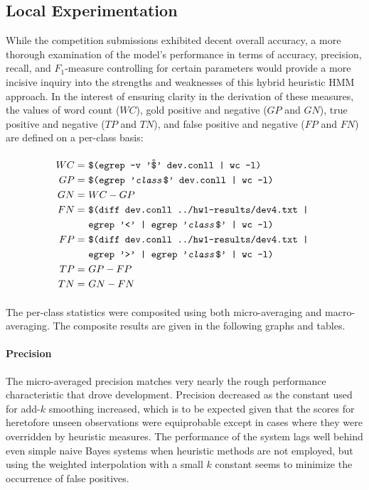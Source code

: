 \documentclass[11pt,a4paper]{article}
\begin{document}
\subsection{Local Experimentation}
While the competition submissions exhibited decent overall accuracy,
a more thorough examination of the model's performance in
terms of accuracy, precision, recall, and $F_{1}$-measure \cite[83-84]{JurafskyMartin}
controlling for certain parameters would provide a more incisive inquiry
into the strengths and weaknesses of this hybrid heuristic HMM approach.
In the interest of ensuring clarity in the derivation of these measures,
the values of word count ($WC$), gold positive and negative ($GP$ and $GN$),
true positive and negative ($TP$ and $TN$), and false positive and negative
($FP$ and $FN$) are defined on a per-class basis:

\paragraph{}
{\tiny
\begin{align*}{}
  WC =&\ \texttt{\$(egrep -v '\^\$' dev.conll | wc -l)} \\
  GP =&\ \texttt{\$(egrep '\emph{class}\$' dev.conll | wc -l)} \\
  GN =&\ WC - GP \\
  FN =&\ \texttt{\$(diff dev.conll ../hw1-results/dev4.txt | } \\
     &\  \texttt{egrep '<' | egrep '\emph{class}\$' | wc -l)} \\
  FP =&\ \texttt{\$(diff dev.conll ../hw1-results/dev4.txt | } \\
     &\  \texttt{egrep '>' | egrep '\emph{class}\$' | wc -l)} \\
  TP =&\ GP - FP \\
  TN =&\ GN - FN
\end{align*}}

\paragraph{}
The per-class statistics were composited using both micro-averaging
and macro-averaging. The composite results are given in the
following graphs and tables.

\paragraph{Precision}
The micro-averaged precision matches very nearly the rough performance
characteristic that drove development. Precision decreased as
the constant used for add-$k$ smoothing increased, which is to be
expected given that the scores for heretofore unseen
observations were equiprobable except in cases where they were
overridden by heuristic measures. The performance of the system
lags well behind even simple naive Bayes systems when heuristic
methods are not employed, but using the weighted interpolation
with a small $k$ constant seems to minimize the occurrence of
false positives.
\end{document}
